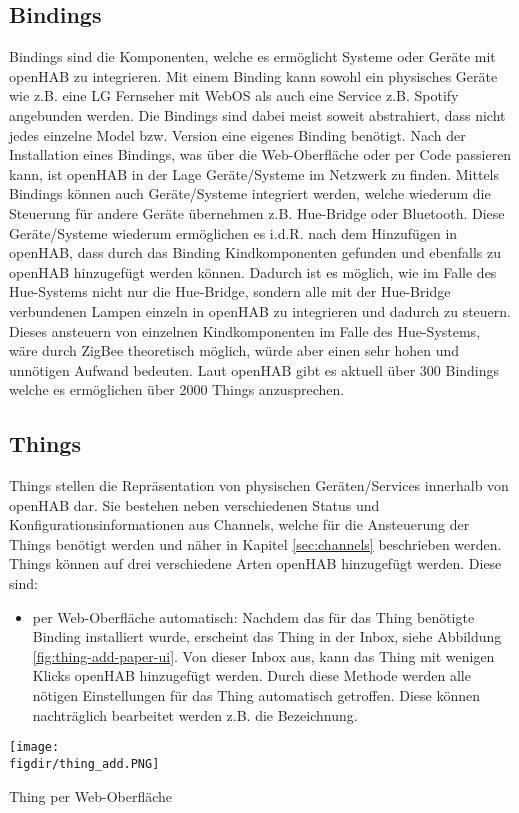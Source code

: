 \subsection{Bindings} \label{sec:Bindings}
Bindings sind die Komponenten, welche es ermöglicht Systeme oder Geräte mit openHAB zu integrieren. Mit einem Binding kann sowohl ein physisches Geräte wie z.B. eine LG Fernseher mit WebOS als auch eine Service z.B. Spotify angebunden werden. Die Bindings sind dabei meist soweit abstrahiert, dass nicht jedes einzelne Model bzw. Version eine eigenes Binding benötigt.
Nach der Installation eines Bindings, was über die Web-Oberfläche oder per Code passieren kann, ist openHAB in der Lage Geräte/Systeme im Netzwerk zu finden. Mittels Bindings können auch Geräte/Systeme integriert werden, welche wiederum die Steuerung für andere Geräte übernehmen z.B. Hue-Bridge oder Bluetooth. Diese Geräte/Systeme wiederum ermöglichen es i.d.R. nach dem Hinzufügen in openHAB, dass durch das Binding Kindkomponenten gefunden und ebenfalls zu openHAB hinzugefügt werden können. Dadurch ist es möglich, wie im Falle des Hue-Systems nicht nur die Hue-Bridge, sondern alle mit der Hue-Bridge verbundenen Lampen einzeln in openHAB zu integrieren und dadurch zu steuern. Dieses ansteuern von einzelnen Kindkomponenten im Falle des Hue-Systems, wäre durch ZigBee theoretisch möglich, würde aber einen sehr hohen und unnötigen Aufwand bedeuten. 
Laut openHAB gibt es aktuell über 300 Bindings welche es ermöglichen über 2000 Things anzusprechen.

\subsection{Things}
Things stellen die Repräsentation von physischen Geräten/Services innerhalb von openHAB dar. Sie bestehen neben verschiedenen Status und Konfigurationsinformationen aus Channels, welche für die Ansteuerung der Things benötigt werden und näher in Kapitel \ref{sec:channels} beschrieben werden.
Things können auf drei verschiedene Arten openHAB hinzugefügt werden. Diese sind:
\begin{itemize}
	\item per Web-Oberfläche automatisch: Nachdem das für das Thing benötigte Binding installiert wurde, erscheint das Thing in der Inbox, siehe Abbildung \ref{fig:thing-add-paper-ui}. Von dieser Inbox aus, kann das Thing mit wenigen Klicks openHAB hinzugefügt werden. Durch diese Methode werden alle nötigen Einstellungen für das Thing automatisch getroffen. Diese können nachträglich bearbeitet werden z.B. die Bezeichnung. 
\end{itemize}
	\centering
	\captionsetup{type=figure}
	\texttt{[image: \\figdir/thing\_add.PNG]}
	\caption{Thing per Web-Oberfläche \label{fig:thing-add-paper-ui}}
	
